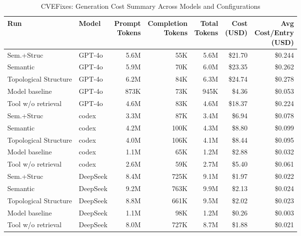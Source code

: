 \begin{table}[H]
  \centering
  \caption{CVEFixes: Generation Cost Summary Across Models and Configurations}
  \label{tab:cvefixes_generation_cost_summary}
  \begin{tabular}{llrrrrr}
    \toprule
Run & Model & \makecell{Prompt\\Tokens} & \makecell{Completion\\Tokens} & \makecell{Total\\Tokens} & \makecell{Cost\\(USD)} & \makecell{Avg\\Cost/Entry\\(USD)} \\
    \midrule
    Sem.+Struc & GPT-4o & 5.6M & 55K & 5.6M & \$21.70 & \$0.244 \\
    Semantic & GPT-4o & 5.9M & 70K & 6.0M & \$23.35 & \$0.262 \\
    Topological Structure & GPT-4o & 6.2M & 84K & 6.3M & \$24.74 & \$0.278 \\
    Model baseline & GPT-4o & 873K & 73K & 945K & \$4.36 & \$0.053 \\
    Tool w/o retrieval & GPT-4o & 4.6M & 83K & 4.6M & \$18.37 & \$0.224 \\
    \midrule
    Sem.+Struc & codex & 3.3M & 87K & 3.4M & \$6.94 & \$0.078 \\
    Semantic & codex & 4.2M & 100K & 4.3M & \$8.80 & \$0.099 \\
    Topological Structure & codex & 4.0M & 106K & 4.1M & \$8.44 & \$0.095 \\
    Model baseline & codex & 1.1M & 65K & 1.2M & \$2.88 & \$0.032 \\
    Tool w/o retrieval & codex & 2.6M & 59K & 2.7M & \$5.40 & \$0.061 \\
    \midrule
    Sem.+Struc & DeepSeek & 8.4M & 725K & 9.1M & \$1.97 & \$0.022 \\
    Semantic & DeepSeek & 9.2M & 763K & 9.9M & \$2.13 & \$0.024 \\
    Topological Structure & DeepSeek & 8.8M & 661K & 9.5M & \$2.02 & \$0.023 \\
    Model baseline & DeepSeek & 1.1M & 98K & 1.2M & \$0.26 & \$0.003 \\
    Tool w/o retrieval & DeepSeek & 8.0M & 727K & 8.7M & \$1.88 & \$0.021 \\
    \bottomrule
  \end{tabular}
\end{table}


